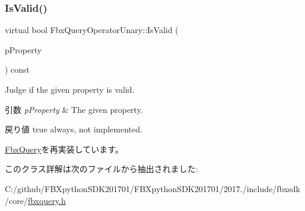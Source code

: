 \subsubsection{\texorpdfstring{Is\+Valid()}{IsValid()}}
{\footnotesize\ttfamily virtual bool Fbx\+Query\+Operator\+Unary\+::\+Is\+Valid (\begin{DoxyParamCaption}\item[{const \hyperlink{class_fbx_property}{Fbx\+Property} \&}]{p\+Property }\end{DoxyParamCaption}) const\hspace{0.3cm}{\ttfamily [virtual]}}

Judge if the given property is valid. 
\begin{DoxyParams}{引数}
{\em p\+Property} & The given property. \\
\hline
\end{DoxyParams}
\begin{DoxyReturn}{戻り値}
{\ttfamily true} always, not implemented. 
\end{DoxyReturn}


\hyperlink{class_fbx_query_a822776baf45a56d8e126e948ec25d920}{Fbx\+Query}を再実装しています。



このクラス詳解は次のファイルから抽出されました\+:\begin{DoxyCompactItemize}
\item 
C\+:/github/\+F\+B\+Xpython\+S\+D\+K201701/\+F\+B\+Xpython\+S\+D\+K201701/2017./include/fbxsdk/core/\hyperlink{fbxquery_8h}{fbxquery.\+h}\end{DoxyCompactItemize}

